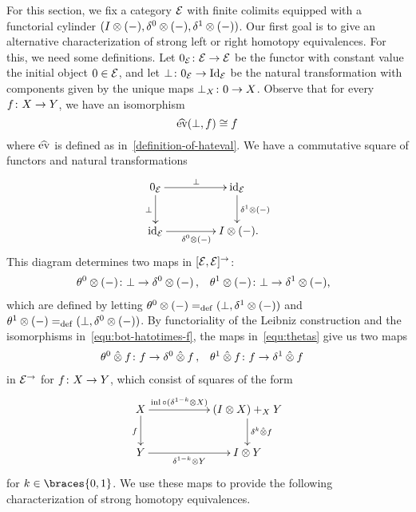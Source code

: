 \documentclass[reqno,10pt,a4paper,oneside,draft]{amsart}
\begin{document}
For this section, we fix a category $\mathcal{E}$ with finite colimits equipped with a functorial cylinder $(I \otimes (-), \delta^0 \otimes (-), \delta^1 \otimes (-))$.
Our first goal is to give an alternative characterization of strong left or right homotopy equivalences.
For this, we need some definitions.
Let $0_{\mathcal{E}} \colon \mathcal{E} \to \mathcal{E}$ be the functor with constant value the initial object $0 \in \mathcal{E}$, and let $\bot \colon 0_{\mathcal{E}} \rightarrow \operatorname{Id}_{\mathcal{E}}$ be the natural transformation with components given by the unique maps $\bot_X \colon 0 \to X$.
Observe that for every $f \colon X \to Y$, we have an isomorphism
\begin{equation}
\label{equ:bot-hatotimes-f}
\widehat{\operatorname{ev}}(\bot, f) \cong f
\end{equation}
where $\widehat{\operatorname{ev}}$ is defined as in~\eqref{definition-of-hateval}.
We have a commutative square of functors and natural transformations
\begin{equation} \label{the-trivial-square}
\begin{gathered}
\xymatrix@C+2em{
  0_\catE
  \ar[r]^{\bot}
  \ar[d]_{\bot}
&
  \id_\catE
  \ar[d]^{\rcyl \otimes (-)}
\\
  \id_\catE
  \ar[r]_{\lcyl \otimes (-)}
&
  \interval \otimes (-)
\rlap{.}}
\end{gathered}
\end{equation}
This diagram determines two maps in $[\mathcal{E}, \mathcal{E}]^\to$:
\begin{equation} \label{equ:thetas}
\begin{aligned}
  \thetal \otimes (-) &\co \bot \rightarrow \lcyl \otimes (-)
\, ,&
  \thetar \otimes (-) &\co \bot \rightarrow \rcyl \otimes (-)
\rlap{,}
\end{aligned}
\end{equation}
which are defined by letting $\theta^0 \otimes (-) =_{\operatorname{def}} (\bot, \delta^1 \otimes (-))$ and $\theta^1 \otimes (-) =_{\operatorname{def}} (\bot, \delta^0 \otimes (-))$.
By functoriality of the Leibniz construction and the isomorphisms in~\eqref{equ:bot-hatotimes-f}, the maps in~\eqref{equ:thetas} give us two maps
\begin{equation*}
\begin{aligned}
  \theta^0 \mathbin{\hat{\otimes}} f &\colon f \to \delta^0 \mathbin{\hat{\otimes}} f
\, ,&
  \theta^1 \mathbin{\hat{\otimes}} f &\colon f \to \delta^1 \mathbin{\hat{\otimes}} f
\end{aligned}
\end{equation*}
in $\mathcal{E}^\to$ for $f \colon X \to Y$, which consist of squares of the form
\[
\xymatrix@C+3em{
  X
  \ar[r]^-{\inl \cc (\kcylinv \otimes X)}
  \ar[d]_{f}
&
  (\interval \otimes X) +_X Y \ar[d]^{\kcyl \hatotimes f}
\\
  Y
  \ar[r]_-{\kcylinv \otimes Y}
&
  \interval \otimes Y
}
\]
for $k \in \braces{0, 1}$.
We use these maps to provide the following characterization of strong homotopy equivalences.
\end{document}
